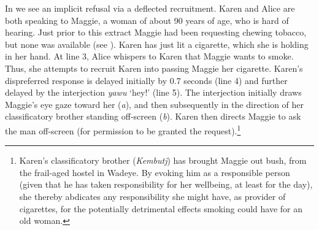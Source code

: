\documentclass[output=paper,nonflat,colorlinks,citecolor=brown]{langsci/langscibook}
\begin{document}
In  we see an implicit refusal via a deflected recruitment. Karen and Alice are both speaking to Maggie, a woman of about 90 years of age, who is hard of hearing. Just prior to this extract Maggie had been requesting chewing tobacco, but none was available (see ). Karen has just lit a cigarette, which she is holding in her hand. At line 3, Alice whispers to Karen that Maggie wants to smoke. Thus, she attempts to recruit Karen into passing Maggie her cigarette. Karen’s dispreferred response is delayed initially by 0.7 seconds (line 4) and further delayed by the interjection \textit{yawu} ‘hey!’ (line 5). The interjection initially draws Maggie’s eye gaze toward her (\textit{a}), and then subsequently in the direction of her classificatory brother standing off-screen (\textit{b}). Karen then directs Maggie to ask the man off-screen (for permission to be granted the request).\footnote{Karen’s classificatory brother (\textit{Kembutj}) has brought Maggie out bush, from the frail-aged hostel in Wadeye. By evoking him as a responsible person (given that he has taken responsibility for her wellbeing, at least for the day), she thereby abdicates any responsibility she might have, as provider of cigarettes, for the potentially detrimental effects smoking could have for an old woman.}
\end{document}
